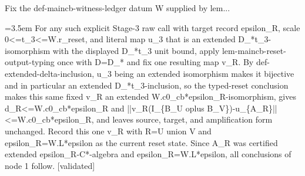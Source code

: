 \documentclass{article}
\newcommand{\step}[1]{\par\noindent\hangindent=3.5em\hangafter=1%
  \makebox[3.5em][l]{\textbf{#1.}}}
\newcommand{\steptag}[1]{\hfill{\small\textsf{[#1]}}}
\begin{document}
\begin{proofbox}{Fix the def-maincb-witness-ledger datum W supplied by lem...}
\step{1.2.2.2.2.2} For any such explicit Stage-3 raw call with target record epsilon\_R, scale 0<=t\_3<=W.r\_reset, and literal map u\_3 that is an extended D\_*t\_3-isomorphism with the displayed D\_*t\_3 unit bound, apply lem-maincb-reset-output-typing once with D=D\_* and fix one resulting map v\_R. By def-extended-delta-inclusion, u\_3 being an extended isomorphism makes it bijective and in particular an extended D\_*t\_3-inclusion, so the typed-reset conclusion makes this same fixed v\_R an extended W.c0\_cb*epsilon\_R-isomorphism, gives d\_R<=W.c0\_cb*epsilon\_R and ||v\_R(I\_\{B\_U oplus B\_V\})-u\_\{A\_R\}||<=W.c0\_cb*epsilon\_R, and leaves source, target, and amplification form unchanged. Record this one v\_R with R=U union V and epsilon\_R=W.L*epsilon as the current reset state. Since A\_R was certified extended epsilon\_R-C*-algebra and epsilon\_R=W.L*epsilon, all conclusions of node 1 follow. \steptag{validated} \\[4pt]
\end{proofbox}
\end{document}
